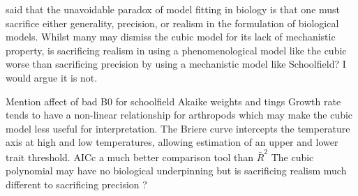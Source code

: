 \documentclass[twoside,twocolumn,11pt]{article}
\begin{document}
\cite{Levins1966} said that the unavoidable paradox of model fitting in biology is that one must sacrifice either 
generality, precision, or realism in the formulation of biological models.
Whilst many may dismiss the cubic model for its lack of mechanistic property, is 
sacrificing realism in using a phenomenological model like the cubic worse than sacrificing precision
by using a mechanistic model like Schoolfield? I would argue it is not.



Mention affect of bad B0 for schoolfield
Akaike weights and tings
Growth rate tends to have a non-linear relationship for arthropods \citep{Briere1999} which may make the cubic model 
less useful  for interpretation.
The Briere curve intercepts the temperature axis at high and low temperatures, allowing estimation 
of an upper and lower trait threshold.
AICc a much better comparison tool than $\bar{R}^2$ \citep{Johnson2004}
The cubic polynomial may have no biological underpinning but is sacrificing realism much different to 
sacrificing precision \citep{Levins1966}?




\end{document}
